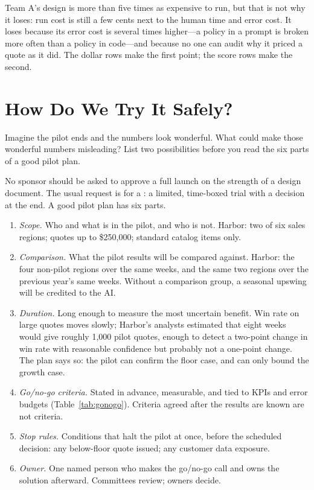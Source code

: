 Team A's design is more than five times as expensive to run, but that is not why it loses: run cost is still a few cents next to the human time and error cost. It loses because its error cost is several times higher---a policy in a prompt is broken more often than a policy in code---and because no one can audit why it priced a quote as it did. The dollar rows make the first point; the score rows make the second.

\section{How Do We Try It Safely?}
\label{sec:rollout}

\begin{thinkabout}
Imagine the pilot ends and the numbers look wonderful. What could make those wonderful numbers misleading? List two possibilities before you read the six parts of a good pilot plan.
\end{thinkabout}

No sponsor should be asked to approve a full launch on the strength of a design document. The usual request is for a : a limited, time-boxed trial with a decision at the end. A good pilot plan has six parts.

\begin{enumerate}[itemsep=2pt]
  \item \emph{Scope.} Who and what is in the pilot, and who is not. Harbor: two of six sales regions; quotes up to \$250{,}000; standard catalog items only.
  \item \emph{Comparison.} What the pilot results will be compared against. Harbor: the four non-pilot regions over the same weeks, and the same two regions over the previous year's same weeks. Without a comparison group, a seasonal upswing will be credited to the AI.
  \item \emph{Duration.} Long enough to measure the most uncertain benefit. Win rate on large quotes moves slowly; Harbor's analysts estimated that eight weeks would give roughly 1{,}000 pilot quotes, enough to detect a two-point change in win rate with reasonable confidence but probably not a one-point change. The plan says so: the pilot can confirm the floor case, and can only bound the growth case.
  \item \emph{Go/no-go criteria.} Stated in advance, measurable, and tied to KPIs and error budgets (Table~\ref{tab:gonogo}). Criteria agreed after the results are known are not criteria.
  \item \emph{Stop rules.} Conditions that halt the pilot at once, before the scheduled decision: any below-floor quote issued; any customer data exposure.
  \item \emph{Owner.} One named person who makes the go/no-go call and owns the solution afterward. Committees review; owners decide.
\end{enumerate}

